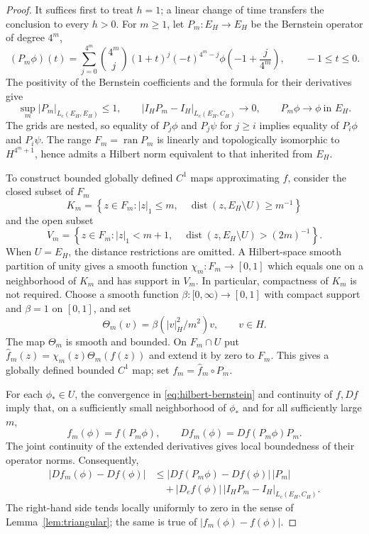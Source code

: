 \documentclass[11pt]{article}
\newcommand{\Lc}{L_c}
\newcommand{\dist}{\operatorname{dist}}
\begin{document}
\begin{proof}
It suffices first to treat $h=1$; a linear change of time
transfers the conclusion to every $h>0$. For $m\ge1$, let
$P_m:E_H\to E_H$ be the Bernstein operator of degree $4^m$,
\[
 (P_m\phi)(t)=\sum_{j=0}^{4^m}
 \binom{4^m}{j}(1+t)^j(-t)^{4^m-j}
 \phi\!\left(-1+\frac{j}{4^m}\right),
 \qquad -1\le t\le0.
\]
The positivity of the Bernstein coefficients and the formula
for their derivatives give
\begin{equation}\label{eq:hilbert-bernstein}
 \sup_m|P_m|_{L_c(E_H,E_H)}\le1,\qquad
 |I_HP_m-I_H|_{\Lc(E_H,C_H)}\longrightarrow0,\qquad
 P_m\phi\longrightarrow\phi\ \text{in }E_H.
\end{equation}
The grids are nested, so equality of $P_j\phi$ and $P_j\psi$
for $j\ge i$ implies equality of $P_i\phi$ and $P_i\psi$.
The range $F_m=\operatorname{ran}P_m$ is linearly and
topologically isomorphic to $H^{4^m+1}$, hence admits a Hilbert
norm equivalent to that inherited from $E_H$.

To construct bounded globally defined $C^1$ maps approximating $f$,
consider the closed subset of $F_m$
\[
 K_m=\left\{z\in F_m:|z|_1\le m,\quad
 \dist(z,E_H\setminus U)\ge m^{-1}\right\}
\]
and the open subset
\[
 V_m=\left\{z\in F_m:|z|_1<m+1,\quad
 \dist(z,E_H\setminus U)>(2m)^{-1}\right\}.
\]
When $U=E_H$, the distance restrictions are omitted.
A Hilbert-space smooth partition of unity gives a smooth
function $\chi_m:F_m\to[0,1]$ which equals one on a
neighborhood of $K_m$ and has support in $V_m$. In particular,
compactness of $K_m$ is not required.
Choose a smooth function $\beta:[0,\infty)\to[0,1]$
with compact support and $\beta=1$ on $[0,1]$, and set
\[
 \Theta_m(v)=\beta(|v|_H^2/m^2)v,\qquad v\in H.
\]
The map $\Theta_m$ is smooth and bounded. On $F_m\cap U$
put $\widehat f_m(z)=\chi_m(z)\Theta_m(f(z))$ and extend
it by zero to $F_m$. This gives a globally defined bounded
$C^1$ map; set $f_m=\widehat f_m\circ P_m$.

For each $\phi_*\in U$, the convergence in
\eqref{eq:hilbert-bernstein} and continuity of $f,Df$
imply that, on a sufficiently small neighborhood of $\phi_*$
and for all sufficiently large $m$,
\[
 f_m(\phi)=f(P_m\phi),\qquad
 Df_m(\phi)=Df(P_m\phi)P_m.
\]
The joint continuity of the extended derivatives gives local
boundedness of their operator norms. Consequently,
\begin{align*}
 |Df_m(\phi)-Df(\phi)|
 &\le |Df(P_m\phi)-Df(\phi)|\,|P_m|\\
 &\quad+|D_ef(\phi)|\,
       |I_HP_m-I_H|_{\Lc(E_H,C_H)}.
\end{align*}
The right-hand side tends locally uniformly to zero in the
sense of Lemma~\ref{lem:triangular}; the same is true of
$|f_m(\phi)-f(\phi)|$.


\end{proof}
\end{document}
